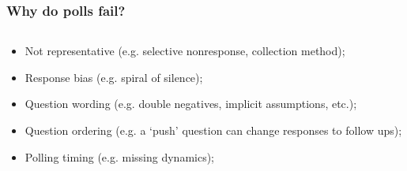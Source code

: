 \documentclass[aspectratio=169]{beamer}
\theoremstyle{principle}
\begin{document}
\begin{frame}
\frametitle{Why do polls fail?}

\begin{columns}
\begin{column}{0.5\textwidth}

\begin{itemize}
\item Not representative (e.g. selective nonresponse, collection method);
\bigskip

\item Response bias (e.g. spiral of silence);
\bigskip

\item Question wording (e.g. double negatives, implicit assumptions, etc.);
\bigskip

\item Question ordering (e.g. a `push' question can change responses to follow ups);
\bigskip

\item Polling timing (e.g. missing dynamics);

\end{itemize}


\end{column}
\end{columns}
\end{frame}
\end{document}
